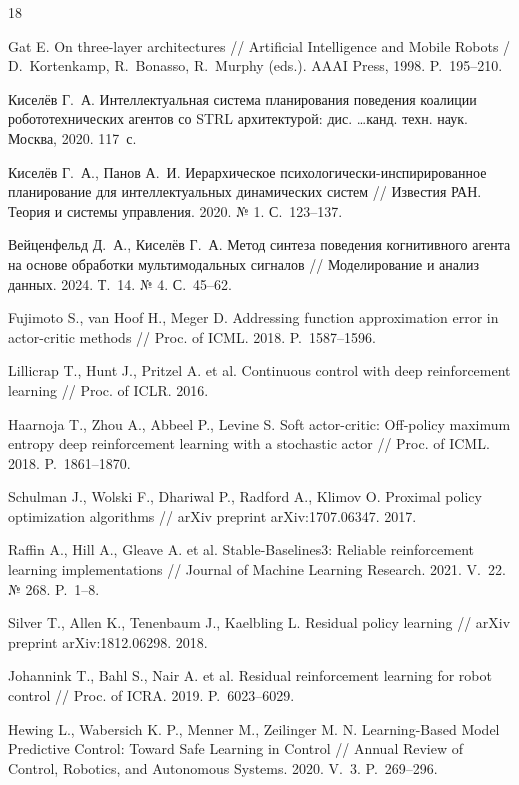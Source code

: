 \documentclass[11pt]{article}
\begin{document}
{\footnotesize\begin{thebibliography}{18}

Gat E. On three-layer architectures
// Artificial Intelligence and Mobile Robots / D.~Kortenkamp, R.~Bonasso, R.~Murphy (eds.). AAAI Press, 1998. P.~195--210.

Киселёв Г.~А. Интеллектуальная система планирования поведения коалиции робототехнических агентов со STRL архитектурой:
дис. \dots канд. техн. наук. Москва, 2020. 117~с.

Киселёв Г.~А., Панов А.~И. Иерархическое психологически-инспирированное планирование для интеллектуальных динамических систем
// Известия РАН. Теория и системы управления. 2020. № 1. С.~123--137.

Вейценфельд Д.~А., Киселёв Г.~А. Метод синтеза поведения когнитивного агента на основе обработки мультимодальных сигналов
// Моделирование и анализ данных. 2024. Т.~14. № 4. С.~45--62.

Fujimoto S., van Hoof H., Meger D. Addressing function approximation error in actor-critic methods
// Proc. of ICML. 2018. P.~1587--1596.

Lillicrap T., Hunt J., Pritzel A. et al. Continuous control with deep reinforcement learning
// Proc. of ICLR. 2016.

Haarnoja T., Zhou A., Abbeel P., Levine S. Soft actor-critic: Off-policy maximum entropy deep reinforcement learning with a stochastic actor
// Proc. of ICML. 2018. P.~1861--1870.

Schulman J., Wolski F., Dhariwal P., Radford A., Klimov O. Proximal policy optimization algorithms
// arXiv preprint arXiv:1707.06347. 2017.

Raffin A., Hill A., Gleave A. et al. Stable-Baselines3: Reliable reinforcement learning implementations
// Journal of Machine Learning Research. 2021. V.~22. № 268. P.~1--8.

Silver T., Allen K., Tenenbaum J., Kaelbling L. Residual policy learning
// arXiv preprint arXiv:1812.06298. 2018.

Johannink T., Bahl S., Nair A. et al. Residual reinforcement learning for robot control
// Proc. of ICRA. 2019. P.~6023--6029.

Hewing L., Wabersich K. P., Menner M., Zeilinger M. N. Learning-Based Model Predictive Control: Toward Safe Learning in Control // Annual Review of Control, Robotics, and Autonomous Systems. 2020. V.~3. P.~269--296.


\end{thebibliography}}
\end{document}
